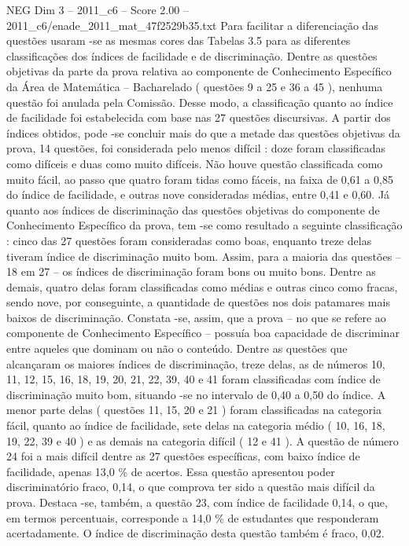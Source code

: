 \begin{textsample}{NEG Dim 3 – 2011\_c6 – Score 2.00 – 2011\_c6/enade\_2011\_mat\_47f2529b35.txt}
Para facilitar a diferenciação das questões usaram -se as mesmas cores das Tabelas 3.5 para as diferentes classificações dos índices de facilidade e de discriminação.
Dentre as questões objetivas da parte da prova relativa ao componente de Conhecimento Específico da Área de Matemática – Bacharelado ( questões 9 a 25 e 36 a 45 ), nenhuma questão foi anulada pela Comissão.
Desse modo, a classificação quanto ao índice de facilidade foi estabelecida com base nas 27 questões discursivas.
A partir dos índices obtidos, pode -se concluir mais do que a metade das questões objetivas da prova, 14 questões, foi considerada pelo menos difícil : doze foram classificadas como difíceis e duas como muito difíceis.
Não houve questão classificada como muito fácil, ao passo que quatro foram tidas como fáceis, na faixa de 0,61 a 0,85 do índice de facilidade, e outras nove consideradas médias, entre 0,41 e 0,60.
Já quanto aos índices de discriminação das questões objetivas do componente de Conhecimento Específico da prova, tem -se como resultado a seguinte classificação : cinco das 27 questões foram consideradas como boas, enquanto treze delas tiveram índice de discriminação muito bom.
Assim, para a maioria das questões – 18 em 27 – os índices de discriminação foram bons ou muito bons.
Dentre as demais, quatro delas foram classificadas como médias e outras cinco como fracas, sendo nove, por conseguinte, a quantidade de questões nos dois patamares mais baixos de discriminação.
Constata -se, assim, que a prova – no que se refere ao componente de Conhecimento Específico – possuía boa capacidade de discriminar entre aqueles que dominam ou não o conteúdo.
Dentre as questões que alcançaram os maiores índices de discriminação, treze delas, as de números 10, 11, 12, 15, 16, 18, 19, 20, 21, 22, 39, 40 e 41 foram classificadas com índice de discriminação muito bom, situando -se no intervalo de 0,40 a 0,50 do índice.
A menor parte delas ( questões 11, 15, 20 e 21 ) foram classificadas na categoria fácil, quanto ao índice de facilidade, sete delas na categoria médio ( 10, 16, 18, 19, 22, 39 e 40 ) e as demais na categoria difícil ( 12 e 41 ).
A questão de número 24 foi a mais difícil dentre as 27 questões específicas, com baixo índice de facilidade, apenas 13,0 \% de acertos.
Essa questão apresentou poder discriminatório fraco, 0,14, o que comprova ter sido a questão mais difícil da prova.
Destaca -se, também, a questão 23, com índice de facilidade 0,14, o que, em termos percentuais, corresponde a 14,0 \% de estudantes que responderam acertadamente.
O índice de discriminação desta questão também é fraco, 0,02.

\end{textsample}

